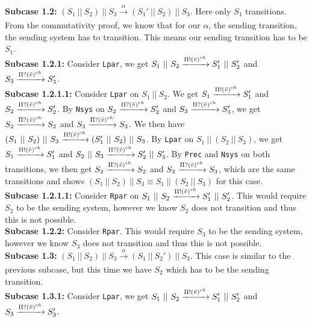 \indent \textbf{Subcase 1.2: }$(S_1 \ || \ S_2)\ ||\ S_3 \xrightarrow[]{\alpha} (S_1' \ || \ S_2)\ ||\ S_3$. Here only $S_1$ transitions. From the commutativity proof, we know that for our $\alpha$, the sending transition, the sending system has to transition. This means our sending transition has to be $S_1$.\\
\indent \indent \textbf{Subcase 1.2.1: } Consider \texttt{Lpar}, we get $S_1 \ || \ S_2 \xrightarrow[]{\Pi ! (\Tilde{v})^{ch}} S_1' \ || \ S_2'$ and $S_3 \xrightarrow[]{\Pi ? (\Tilde{v})^{ch}} S_3'$.\\
\indent \indent \indent \textbf{Subcase 1.2.1.1: } Consider \texttt{Lpar} on $S_1\ ||\ S_2$. We get $S_1 \xrightarrow[]{\Pi ! (\Tilde{v})^{ch}} S_1'$ and $S_2 \xrightarrow[]{\Pi ? (\Tilde{v})^{ch}} S_2'$. By \texttt{Nsys} on $S_2 \xrightarrow[]{\Pi ? (\Tilde{v})^{ch}} S_2'$ and $S_3 \xrightarrow[]{\Pi ? (\Tilde{v})^{ch}} S_3'$, we get $S_2 \xrightarrow[]{\Pi ? (\Tilde{v})^{ch}} S_2$ and $S_3 \xrightarrow[]{\Pi ? (\Tilde{v})^{ch}} S_3$. We then have $(S_1 \ || \ S_2)\ ||\ S_3 \xrightarrow[]{\Pi ! (\Tilde{v})^{ch}} (S_1' \ || \ S_2)\ ||\ S_3$. By \texttt{Lpar} on $S_1 \ ||\ (S_2 \ || \ S_3)$, we get $S_1 \xrightarrow[]{\Pi ! (\Tilde{v})^{ch}} S_1'$ and $S_2 \ || \ S_3 \xrightarrow[]{\Pi ? (\Tilde{v})^{ch}} S_2' \ || \ S_3'$. By \texttt{Prec} and \texttt{Nsys} on both transitions, we then get $S_2 \xrightarrow[]{\Pi ? (\Tilde{v})^{ch}} S_2$ and $S_3 \xrightarrow[]{\Pi ? (\Tilde{v})^{ch}} S_3$, which are the same transitions and shows $(S_1 \ ||\ S_2 )\ || \ S_3 \equiv S_1 \ ||\ (S_2 \ || \ S_3)$ for this case. \\
\indent \indent \indent \textbf{Subcase 1.2.1.1: } Consider \texttt{Rpar} on $S_1 \ || \ S_2 \xrightarrow[]{\Pi ! (\Tilde{v})^{ch}} S_1' \ || \ S_2'$. This would require $S_2$ to be the sending system, however we know $S_2$ does not transition and thus this is not possible.\\
\indent \indent \textbf{Subcase 1.2.2: } Consider \texttt{Rpar}. This would require $S_3$ to be the sending system, however we know $S_3$ does not transition and thus this is not possible.\\
\indent \textbf{Subcase 1.3: }$(S_1 \ || \ S_2)\ ||\ S_3 \xrightarrow[]{\alpha} (S_1 \ || \ S_2')\ ||\ S_3$. This case is similar to the previous subcase, but this time we have $S_2$ which has to be the sending transition.\\
\indent \indent \textbf{Subcase 1.3.1: } Consider \texttt{Lpar}, we get $S_1 \ || \ S_2 \xrightarrow[]{\Pi ! (\Tilde{v})^{ch}} S_1' \ || \ S_2'$ and $S_3 \xrightarrow[]{\Pi ? (\Tilde{v})^{ch}} S_3'$.\\
